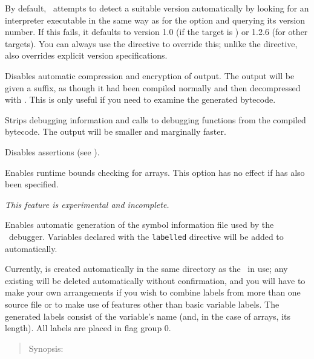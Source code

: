 \begin{nicelist}
    By default, \compiler\ attempts to detect a suitable version automatically 
    by looking for an interpreter executable in the same way as for the 
     option and querying its version number.  If this fails, it 
    defaults to version 1.0 (if the target is \avgns) or 1.2.6 (for other 
    targets). You can always use the  directive to override 
    this; unlike the  directive,  also overrides 
    explicit version specifications.    
  \item[\clboth{u}{uncompressed}]
    Disables automatic compression and encryption of output.  The output will be
    given a  suffix, as though it had been compiled normally
    and then decompressed with .  This is only useful if you need
    to examine the generated bytecode.
  \item[\clboth{g}{no-debug}]
    Strips debugging information and calls to debugging functions from the 
    compiled bytecode.  The output will be smaller and marginally faster.
  \item[\cllong{no-assert}]
    Disables assertions (see ).
  \item[\cllong{safe-arrays}]
    Enables runtime bounds checking for arrays.  This option has no effect if
     has also been specified.
  \item[\cllong{flag-labels}]
    \emph{This feature is experimental and incomplete.}

    Enables automatic generation of the  symbol information file 
    used by the \reallive\ debugger.  Variables declared with the 
    \texttt{labelled} directive will be added to  automatically.  
    
    Currently,  is created automatically in the same directory as 
    the \gameexe\ in use; any existing  will be deleted 
    automatically without confirmation, and you will have to make your own 
    arrangements if you wish to combine labels from more than one source file or 
    to make use of  features other than basic variable labels. 
    The generated labels consist of the variable's name (and, in the case of 
    arrays, its length).  All labels are placed in flag group 0.    
  \end{nicelist}

\clearpage
{}

  \begin{quote}
    Synopsis:   
  \end{quote}


